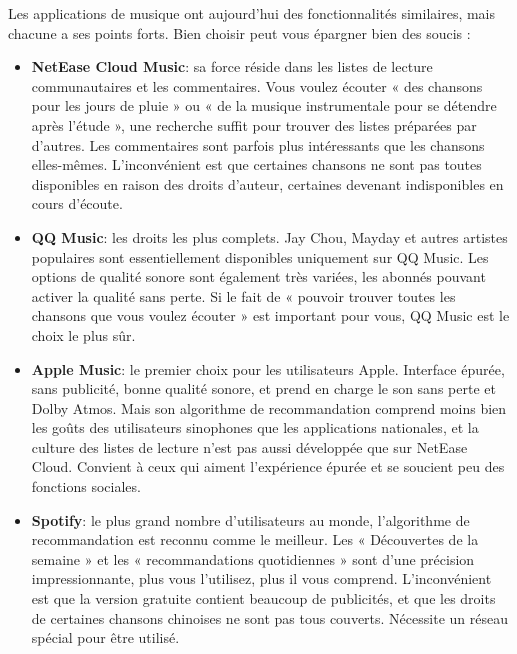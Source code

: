 


Les applications de musique ont aujourd'hui des fonctionnalités similaires, mais chacune a ses points forts. Bien choisir peut vous épargner bien des soucis :

\begin{itemize}
  \item \textbf{NetEase Cloud Music}: sa force réside dans les listes de lecture communautaires et les commentaires. Vous voulez écouter « des chansons pour les jours de pluie » ou « de la musique instrumentale pour se détendre après l'étude », une recherche suffit pour trouver des listes préparées par d'autres. Les commentaires sont parfois plus intéressants que les chansons elles-mêmes. L'inconvénient est que certaines chansons ne sont pas toutes disponibles en raison des droits d'auteur, certaines devenant indisponibles en cours d'écoute.
  \item \textbf{QQ Music}: les droits les plus complets. Jay Chou, Mayday et autres artistes populaires sont essentiellement disponibles uniquement sur QQ Music. Les options de qualité sonore sont également très variées, les abonnés pouvant activer la qualité sans perte. Si le fait de « pouvoir trouver toutes les chansons que vous voulez écouter » est important pour vous, QQ Music est le choix le plus sûr.
  \item \textbf{Apple Music}: le premier choix pour les utilisateurs Apple. Interface épurée, sans publicité, bonne qualité sonore, et prend en charge le son sans perte et Dolby Atmos. Mais son algorithme de recommandation comprend moins bien les goûts des utilisateurs sinophones que les applications nationales, et la culture des listes de lecture n'est pas aussi développée que sur NetEase Cloud. Convient à ceux qui aiment l'expérience épurée et se soucient peu des fonctions sociales.
  \item \textbf{Spotify}: le plus grand nombre d'utilisateurs au monde, l'algorithme de recommandation est reconnu comme le meilleur. Les « Découvertes de la semaine » et les « recommandations quotidiennes » sont d'une précision impressionnante, plus vous l'utilisez, plus il vous comprend. L'inconvénient est que la version gratuite contient beaucoup de publicités, et que les droits de certaines chansons chinoises ne sont pas tous couverts. Nécessite un réseau spécial pour être utilisé.
\end{itemize}

